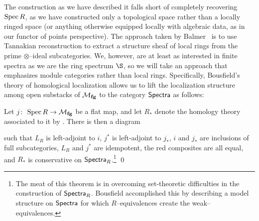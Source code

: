 The construction as we have described it falls short of completely recovering $\operatorname{Spec} R$, as we have constructed only a topological space rather than a locally ringed space (or anything otherwise equipped locally with algebraic data, as in our functor of points perspective).  The approach taken by Balmer~\cite[Section 6]{Balmer} is to use Tannakian reconstruction to extract a structure sheaf of local rings from the prime $\otimes$--ideal subcategories.  We, however, are at least as interested in finite spectra as we are the ring spectrum $\S$, so we will take an approach that emphasizes module categories rather than local rings.  Specifically, Bousfield's theory of homological localization allows us to lift the localization structure among open substacks of $\mathcal{M}_{\mathbf{fg}}$ to the category $\mathsf{Spectra}$ as follows:

\begin{theorem}
Let $j\colon\thinspace \operatorname{Spec} R \to \mathcal{M}_{\mathbf{fg}}$ be a flat map, and let $R_*$ denote the homology theory associated to it by .  There is then a diagram
\begin{center}
\end{center}
such that $L_R$ is left-adjoint to $i$, $j^*$ is left-adjoint to $j_*$, $i$ and $j_*$ are inclusions of full subcategories, $L_R$ and $j^*$ are idempotent, the red composites are all equal, and $R_*$ is conservative on $\mathsf{Spectra}_R$.\footnote{The meat of this theorem is in overcoming set-theoretic difficulties in the construction of $\mathsf{Spectra}_R$.  Bousfield accomplished this by describing a model structure on $\mathsf{Spectra}$ for which $R$--equivalences create the weak--equivalences.} \qed
\end{theorem}

